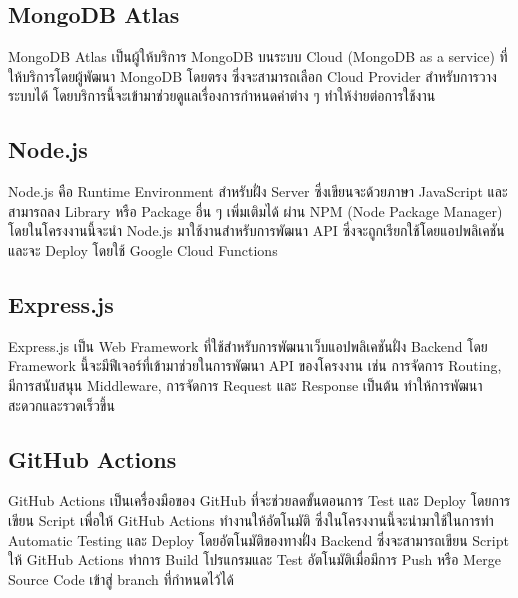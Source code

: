 \subsection{MongoDB Atlas}
MongoDB Atlas เป็นผู้ให้บริการ MongoDB บนระบบ Cloud (MongoDB as a service) ที่ให้บริการโดยผู้พัฒนา MongoDB โดยตรง ซึ่งจะสามารถเลือก Cloud Provider สำหรับการวางระบบได้ โดยบริการนี้จะเข้ามาช่วยดูแลเรื่องการกำหนดค่าต่าง ๆ ทำให้ง่ายต่อการใช้งาน

\subsection{Node.js}
Node.js คือ Runtime Environment สำหรับฝั่ง Server ซึ่งเขียนจะด้วยภาษา JavaScript และสามารถลง Library หรือ Package อื่น ๆ เพิ่มเติมได้ ผ่าน NPM (Node Package Manager) โดยในโครงงานนี้จะนำ Node.js มาใช้งานสำหรับการพัฒนา API ซึ่งจะถูกเรียกใช้โดยแอปพลิเคชัน และจะ Deploy โดยใช้ Google Cloud Functions

\subsection{Express.js}
Express.js เป็น Web Framework ที่ใช้สำหรับการพัฒนาเว็บแอปพลิเคชันฝั่ง Backend โดย Framework นี้จะมีฟีเจอร์ที่เข้ามาช่วยในการพัฒนา API ของโครงงาน เช่น การจัดการ Routing, มีการสนับสนุน Middleware, การจัดการ Request และ Response เป็นต้น ทำให้การพัฒนาสะดวกและรวดเร็วขึ้น

\subsection{GitHub Actions}
GitHub Actions เป็นเครื่องมือของ GitHub ที่จะช่วยลดขั้นตอนการ Test และ Deploy โดยการเขียน Script เพื่อให้ GitHub Actions ทำงานให้อัตโนมัติ ซึ่งในโครงงานนี้จะนำมาใช้ในการทำ Automatic Testing และ Deploy โดยอัตโนมัติของทางฝั่ง Backend ซึ่งจะสามารถเขียน Script ให้ GitHub Actions ทำการ Build โปรแกรมและ Test อัตโนมัติเมื่อมีการ Push หรือ Merge Source Code เข้าสู่ branch ที่กำหนดไว้ได้


